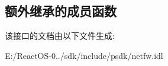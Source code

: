 \subsection*{额外继承的成员函数}


该接口的文档由以下文件生成\+:\begin{DoxyCompactItemize}
\item 
E\+:/\+React\+O\+S-\/0../sdk/include/psdk/netfw.\+idl\end{DoxyCompactItemize}
